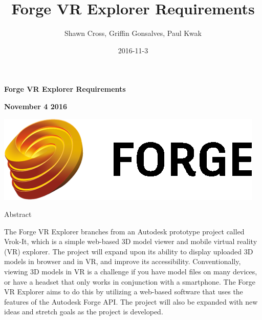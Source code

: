\documentclass[letterpaper, 10pt, draftclsnofoot, compsoc, onecolumn]{IEEEtran}
\title{Forge VR Explorer Requirements}
\author{Shawn Cross, Griffin Gonsalves, Paul Kwak}
\date{2016-11-3}
\begin{document}
\clearpage\setcounter{page}{1}\pagestyle{Standard}
\thispagestyle{FirstPage}

\bigskip

{\centering{}\bfseries\color{black}
Forge VR Explorer Requirements
\par}


\bigskip

{\centering{}\bfseries\color{black}
November 4 2016
\par}
\bigskip
\bigskip
\bigskip
\bigskip
\bigskip
\bigskip
\bigskip
\bigskip
\bigskip
\bigskip
\bigskip
\bigskip
\begin{center}
	\includegraphics[scale=0.8]{forge_logo.png}
\end{center}


\vfill
{\centering{}\bfseries\color{black}

Abstract
\par}

{\centering{}\mdseries\color{black}
The Forge VR Explorer branches from an Autodesk prototype project called Vrok-It, which is a simple web-based 3D model viewer and mobile virtual reality (VR) explorer. The project will expand upon its ability to display uploaded 3D models in browser and in VR, and improve its accessibility. Conventionally, viewing 3D models in VR is a challenge if you have model files on many devices, or have a headset that only works in conjunction with a smartphone. The Forge VR Explorer aims to do this by utilizing a web-based software that uses the features of the Autodesk Forge API. The project will also be expanded with new ideas and stretch goals as the project is developed.
\par}

\bigskip


\bigskip



\bigskip
\end{document}
